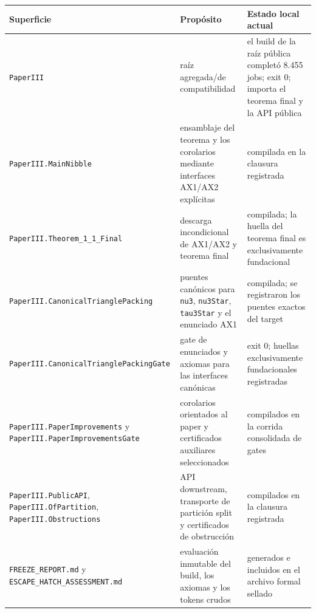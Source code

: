 \documentclass[
  spanish,
  11pt,
  a4paper,
]{article}
\newcounter{none} %
\begin{document}
{\def\LTcaptype{none} %
\begin{longtable}[]{@{}
  >{\raggedright\arraybackslash}p{}
  >{\raggedright\arraybackslash}p{}
  >{\raggedright\arraybackslash}p{}@{}}
\toprule\noalign{}
\begin{minipage}[b]{\linewidth}\raggedright
Superficie
\end{minipage} & \begin{minipage}[b]{\linewidth}\raggedright
Propósito
\end{minipage} & \begin{minipage}[b]{\linewidth}\raggedright
Estado local actual
\end{minipage} \\
\midrule\noalign{}
\endhead
\bottomrule\noalign{}
\endlastfoot
\texttt{PaperIII} & raíz agregada/de compatibilidad & el build de la raíz pública completó 8.455 jobs; exit 0; importa el teorema final y la API pública \\
\texttt{PaperIII.MainNibble} & ensamblaje del teorema y los corolarios mediante interfaces AX1/AX2 explícitas & compilada en la clausura registrada \\
\texttt{PaperIII.Theorem\_1\_1\_Final} & descarga incondicional de AX1/AX2 y teorema final & compilada; la huella del teorema final es exclusivamente fundacional \\
\texttt{PaperIII.CanonicalTrianglePacking} & puentes canónicos para \texttt{nu3}, \texttt{nu3Star}, \texttt{tau3Star} y el enunciado AX1 & compilada; se registraron los puentes exactos del target \\
\texttt{PaperIII.CanonicalTrianglePacking\allowbreak{}Gate} & gate de enunciados y axiomas para las interfaces canónicas & exit 0; huellas exclusivamente fundacionales registradas \\
\texttt{PaperIII.PaperImprovements} y \texttt{PaperIII.PaperImprovementsGate} & corolarios orientados al paper y certificados auxiliares seleccionados & compilados en la corrida consolidada de gates \\
\texttt{PaperIII.PublicAPI}, \texttt{PaperIII.OfPartition}, \texttt{PaperIII.Obstructions} & API downstream, transporte de partición split y certificados de obstrucción & compilados en la clausura registrada \\
\texttt{FREEZE\_REPORT.md} y \texttt{ESCAPE\_HATCH\_ASSESSMENT.md} & evaluación inmutable del build, los axiomas y los tokens crudos & generados e incluidos en el archivo formal sellado \\
\end{longtable}
}
\end{document}
